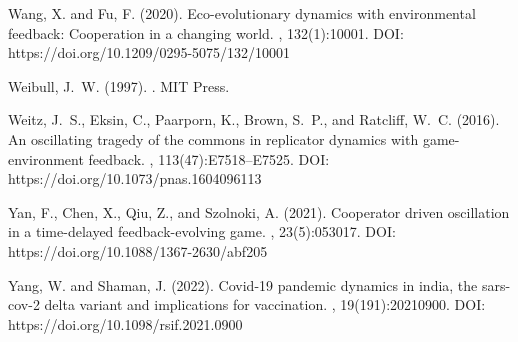 \documentclass[9pt]{elife}
\begin{document}
\begin{thebibliography}{}
Wang, X. and Fu, F. (2020).
\newblock Eco-evolutionary dynamics with environmental feedback: Cooperation in
  a changing world.
, 132(1):10001. DOI: https://doi.org/10.1209/0295-5075/132/10001

Weibull, J.~W. (1997).
.
\newblock MIT Press.

Weitz, J.~S., Eksin, C., Paarporn, K., Brown, S.~P., and Ratcliff, W.~C.
  (2016).
\newblock An oscillating tragedy of the commons in replicator dynamics with
  game-environment feedback.
, 113(47):E7518--E7525. DOI: https://doi.org/10.1073/pnas.1604096113

Yan, F., Chen, X., Qiu, Z., and Szolnoki, A. (2021).
\newblock Cooperator driven oscillation in a time-delayed feedback-evolving
  game.
, 23(5):053017. DOI: https://doi.org/10.1088/1367-2630/abf205

Yang, W. and Shaman, J. (2022).
\newblock Covid-19 pandemic dynamics in india, the sars-cov-2 delta variant and
  implications for vaccination.
, 19(191):20210900. DOI: https://doi.org/10.1098/rsif.2021.0900

\end{thebibliography}

\appendix

\label{first:app}
\end{document}
